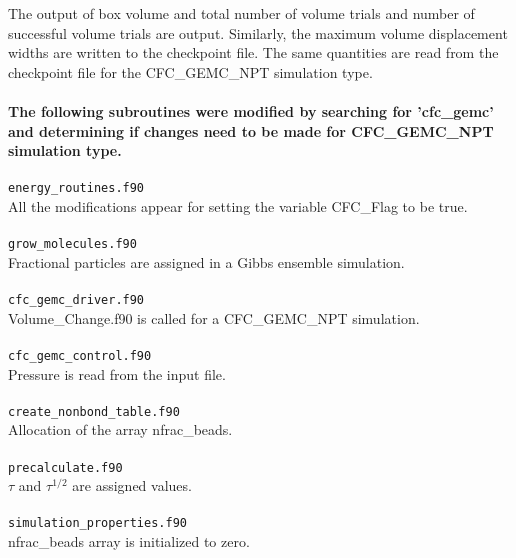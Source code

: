  The output of box volume and total number of volume trials and number of successful volume trials are output. Similarly, the maximum volume displacement widths are written to the checkpoint file. The same quantities are read from the checkpoint file for the CFC\_GEMC\_NPT simulation type. \\ \\
 
 {\bf The following subroutines were modified by searching for 'cfc\_gemc' and determining if changes need to be made for CFC\_GEMC\_NPT simulation type.} \\ \\
 \texttt{energy\_routines.f90} \\ 
 All the modifications appear for setting the variable CFC\_Flag to be true. \\ \\
  \texttt{grow\_molecules.f90} \\ 
 
 Fractional particles are assigned in a Gibbs ensemble simulation. \\ \\
 \texttt{cfc\_gemc\_driver.f90} \\ 
 
 Volume\_Change.f90 is called for a CFC\_GEMC\_NPT simulation. \\ \\
 \texttt{cfc\_gemc\_control.f90} \\ 
 
 Pressure is read from the input file. \\ \\
 \texttt{create\_nonbond\_table.f90} \\ 
 
 Allocation of the array nfrac\_beads. \\ \\
 
%
\texttt{precalculate.f90} \\

$\tau$ and $ \tau^{1/2}$ are assigned values. \\ \\
%
\texttt{simulation\_properties.f90} \\

nfrac\_beads array is initialized to zero.